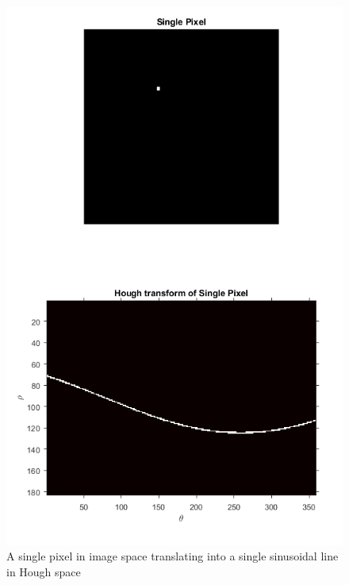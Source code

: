 \documentclass{article}
\begin{document}
	\begin{figure}
		\centering
		\includegraphics[width=5.0in]{HoughBasics}
		\caption{A single pixel in image space translating into a single sinusoidal line in Hough space}
		\label{HoughBasics}
	\end{figure}
	
	
\end{document}
